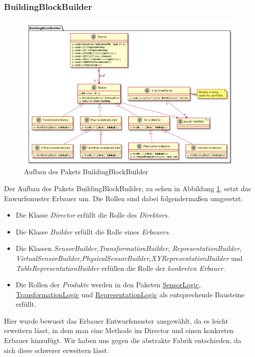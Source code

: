 \documentclass[parskip=full]{scrartcl}
\begin{document}
\subsubsection{BuildingBlockBuilder}
\begin{figure}[htbp]
	\begin{center}
		\includegraphics[width = 16cm]{Grafiken/BuildingBlockBuilder.png}
		\caption{Aufbau des Pakets BuildingBlockBuilder}
		\label{BuildingBlockBuilder}
	\end{center}
\end{figure}

Der Aufbau des Pakets BuildingBlockBuilder, zu sehen in Abbildung \ref{BuildingBlockBuilder}, setzt das Enwurfsmuster Erbauer um. Die Rollen sind dabei folgendermaßen umgesetzt:
\begin{itemize}

\item Die Klasse \textit{Director} erfüllt die Rolle des \textit{Direktors}.
\item Die Klasse \textit{Builder} erfüllt die Rolle eines \textit{Erbauers}.
\item Die Klassen \textit{SensorBuilder},\textit{TransformationBuilder}, \textit{RepresentationBuilder},
\textit{VirtualSensorBuilder},\textit{PhysicalSensorBuilder},\textit{XYRepresentationBuilder} und \textit{TableRepresentationBuilder}  erfüllen die Rolle der \textit{konkreten Erbauer}.
\item Die Rollen der \textit{Produkte} werden in den Paketen \hyperlink{SensorLogic}{SensorLogic}, \hyperlink{TransformationLogic}{TransformationLogic} und \hyperlink{RepresentationLogic}{RepresentationLogic} als entsprechende Bausteine erfüllt.

\end{itemize} 
Hier wurde bewusst das Erbauer Entwurfsmuster ausgewählt, da es leicht erweitern lässt, in dem man eine Methode im Director und einen konkreten Erbauer hinzufügt. Wir haben uns gegen die abstrakte Fabrik entschieden, da sich diese schwerer erweitern lässt.
\end{document}
